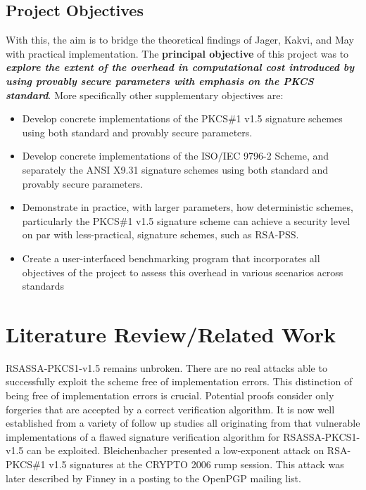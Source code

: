 \documentclass[]{final_report}
\theoremstyle{definition}
\begin{document}
\section{Project Objectives}
With this, the aim is to bridge the theoretical findings of Jager, Kakvi, and May \cite{jager2018security} with practical implementation. The \textbf{principal objective} of this project was to \textit{\textbf{explore the extent of the overhead in computational cost introduced by using provably secure parameters with emphasis on the PKCS standard}}. More specifically other supplementary objectives are:

\begin{itemize}
    \item Develop concrete implementations of the PKCS\#1 v1.5 signature schemes using both standard and provably secure parameters.
    \item Develop concrete implementations of  the ISO/IEC 9796-2 Scheme, and separately the ANSI X9.31 signature schemes using both standard and provably secure parameters.
    \item Demonstrate in practice, with larger parameters, how deterministic schemes, particularly the PKCS\#1 v1.5 signature scheme  can achieve a security level on par with less-practical, signature schemes, such as RSA-PSS.
    \item Create a user-interfaced benchmarking program that incorporates all objectives of the project to assess this overhead in various scenarios across standards
\end{itemize}



 
\chapter{Literature Review/Related Work}
RSASSA-PKCS1-v1.5 remains unbroken. There are no real attacks able to successfully exploit the scheme free of implementation errors. This distinction of being free of implementation errors is crucial. Potential proofs consider only forgeries that are accepted by a correct verification algorithm. It is now well established from a variety of follow up studies all originating from \cite{bleichenbacher1998chosen} that vulnerable implementations of a flawed signature verification algorithm for RSASSA-PKCS1-v1.5 can be exploited. Bleichenbacher presented a low-exponent attack on RSA-PKCS\#1 v1.5 signatures at the CRYPTO 2006 rump session. This attack was later described by Finney \cite{finney2006bleichenbacher} in a posting to the OpenPGP mailing list. 
\end{document}
